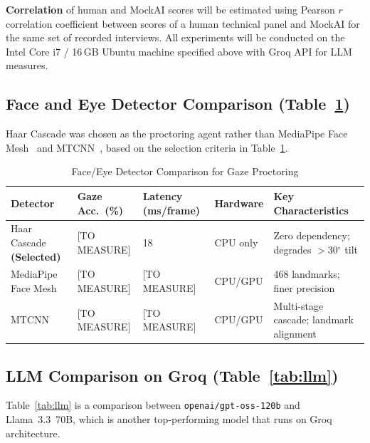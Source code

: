 \documentclass[conference]{IEEEtran}
\begin{document}
\textbf{Correlation} of human and MockAI scores will be estimated using
Pearson $r$ correlation coefficient between scores of a human technical
panel and MockAI for the same set of recorded interviews. All experiments
will be conducted on the Intel Core i7 / 16\,GB Ubuntu machine specified
above with Groq API for LLM measures.

\subsection{Face and Eye Detector Comparison (Table~\ref{tab:detectors})}
Haar Cascade was chosen as the proctoring agent rather than MediaPipe
Face Mesh~\cite{lugaresi2019} and MTCNN~\cite{zhang2016}, based on the
selection criteria in Table~\ref{tab:detectors}.

\begin{table}[htbp]
  \caption{Face/Eye Detector Comparison for Gaze Proctoring}
  \label{tab:detectors}
  \centering
  \renewcommand{\arraystretch}{1.3}
  \begin{tabular}{p{1.6cm} p{1.35cm} p{1.5cm} p{1.0cm} p{1.55cm}}
    \toprule
    \textbf{Detector} &
    \textbf{Gaze Acc.\ (\%)} &
    \textbf{Latency (ms/frame)} &
    \textbf{Hardware} &
    \textbf{Key Characteristics} \\
    \midrule
    Haar Cascade \newline \textbf{(Selected)} &
    {[TO MEASURE]} &
    18 &
    CPU only &
    Zero dependency; degrades $>$30$^\circ$ tilt \\
    \addlinespace
    MediaPipe Face Mesh~\cite{lugaresi2019} &
    {[TO MEASURE]} &
    {[TO MEASURE]} &
    CPU/GPU &
    468 landmarks; finer precision \\
    \addlinespace
    MTCNN~\cite{zhang2016} &
    {[TO MEASURE]} &
    {[TO MEASURE]} &
    CPU/GPU &
    Multi-stage cascade; landmark alignment \\
    \bottomrule
  \end{tabular}
\end{table}

\subsection{LLM Comparison on Groq (Table~\ref{tab:llm})}
Table~\ref{tab:llm} is a comparison between
\texttt{openai/gpt-oss-120b} and Llama~3.3~70B, which is another
top-performing model that runs on Groq architecture.
\end{document}
